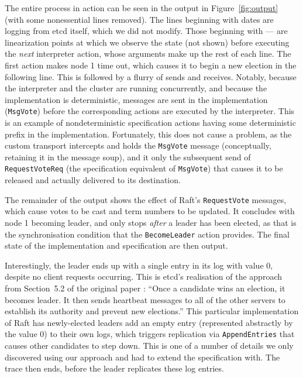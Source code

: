 \documentclass[a4paper]{article}
\begin{document}
The entire process in action can be seen in the output in Figure~\ref{fig:output} (with some nonessential lines removed).
%
The lines beginning with dates are logging from etcd itself, which we did not modify.
%
Those beginning with --- are linearization points at which we observe the state (not shown) before executing the \emph{next} interpreter action, whose arguments make up the rest of each line.
%
The first action makes node 1 time out, which causes it to begin a new election in the following line.
%
This is followed by a flurry of sends and receives.
%
Notably, because the interpreter and the cluster are running concurrently, and because the implementation is deterministic, messages are sent in the implementation (\texttt{MsgVote}) before the corresponding actions are executed by the interpreter.
%
This is an example of nondeterministic specification actions having some deterministic prefix in the implementation.
%
Fortunately, this does not cause a problem, as the custom transport intercepts and holds the \texttt{MsgVote} message (conceptually, retaining it in the message soup), and it only the subsequent send of \texttt{RequestVoteReq} (the specification equivalent of \texttt{MsgVote}) that causes it to be released and actually delivered to its destination.

The remainder of the output shows the effect of Raft's \texttt{RequestVote} messages, which cause votes to be cast and term numbers to be updated.
%
It concludes with node 1 becoming leader, and only stops \emph{after} a leader has been elected, as that is the synchronisation condition that the \texttt{BecomeLeader} action provides.
%
The final state of the implementation and specification are then output.

Interestingly, the leader ends up with a single entry in its log with value 0, despite no client requests occurring.
%
This is etcd's realisation of the approach from Section~5.2 of the original paper \cite{ongaro_search_2014}: ``Once a candidate wins an election, it becomes leader.
%
It then sends heartbeat messages to all of the other servers to establish its authority and prevent new elections.'' This particular implementation of Raft has newly-elected leaders add an empty entry (represented abstractly by the value 0) to their own logs, which triggers replication via \texttt{AppendEntries} that causes other candidates to step down.
%
This is one of a number of details we only discovered using our approach and had to extend the specification with.
%
The trace then ends, before the leader replicates these log entries.
\end{document}
